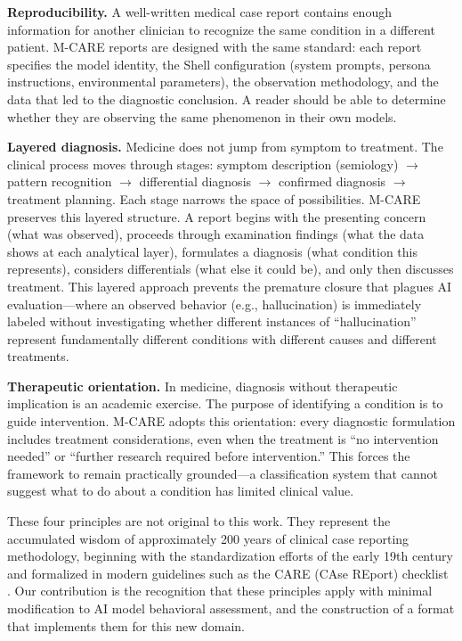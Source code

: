 \documentclass[11pt]{article}
\begin{document}
\textbf{Reproducibility.} A well-written medical case report contains enough information for another clinician to recognize the same condition in a different patient. M-CARE reports are designed with the same standard: each report specifies the model identity, the Shell configuration (system prompts, persona instructions, environmental parameters), the observation methodology, and the data that led to the diagnostic conclusion. A reader should be able to determine whether they are observing the same phenomenon in their own models.

\textbf{Layered diagnosis.} Medicine does not jump from symptom to treatment. The clinical process moves through stages: symptom description (semiology) $\rightarrow$ pattern recognition $\rightarrow$ differential diagnosis $\rightarrow$ confirmed diagnosis $\rightarrow$ treatment planning. Each stage narrows the space of possibilities. M-CARE preserves this layered structure. A report begins with the presenting concern (what was observed), proceeds through examination findings (what the data shows at each analytical layer), formulates a diagnosis (what condition this represents), considers differentials (what else it could be), and only then discusses treatment. This layered approach prevents the premature closure that plagues AI evaluation---where an observed behavior (e.g., hallucination) is immediately labeled without investigating whether different instances of ``hallucination'' represent fundamentally different conditions with different causes and different treatments.

\textbf{Therapeutic orientation.} In medicine, diagnosis without therapeutic implication is an academic exercise. The purpose of identifying a condition is to guide intervention. M-CARE adopts this orientation: every diagnostic formulation includes treatment considerations, even when the treatment is ``no intervention needed'' or ``further research required before intervention.'' This forces the framework to remain practically grounded---a classification system that cannot suggest what to do about a condition has limited clinical value.

These four principles are not original to this work. They represent the accumulated wisdom of approximately 200 years of clinical case reporting methodology, beginning with the standardization efforts of the early 19th century and formalized in modern guidelines such as the CARE (CAse REport) checklist \citep{Gagnier2013}. Our contribution is the recognition that these principles apply with minimal modification to AI model behavioral assessment, and the construction of a format that implements them for this new domain.
\end{document}
